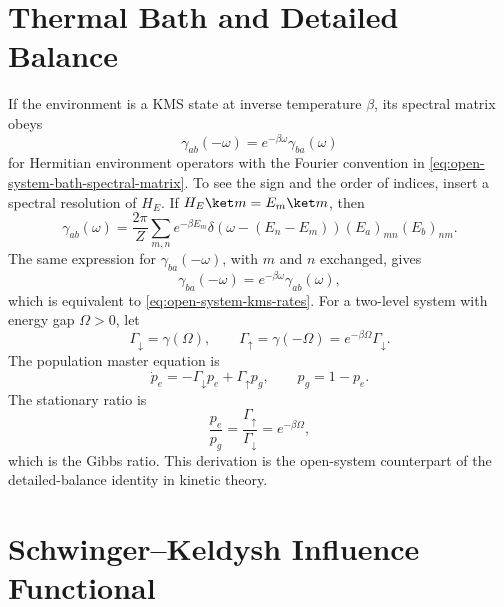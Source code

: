\section{Thermal Bath and Detailed Balance}

If the environment is a KMS state at inverse temperature \(\beta\), its
spectral matrix obeys
\begin{equation}
  \gamma_{ab}(-\omega)=e^{-\beta\omega}\gamma_{ba}(\omega)
  \label{eq:open-system-kms-rates}
\end{equation}
for Hermitian environment operators with the Fourier convention in
\eqref{eq:open-system-bath-spectral-matrix}.  To see the sign and the order
of indices, insert a spectral resolution of \(H_E\).  If
\(H_E\ket m=E_m\ket m\), then
\[
  \gamma_{ab}(\omega)
  =
  \frac{2\pi}{Z}
  \sum_{m,n}
  e^{-\beta E_m}
  \delta\!\left(\omega-(E_n-E_m)\right)
  (E_a)_{mn}(E_b)_{nm}.
\]
The same expression for \(\gamma_{ba}(-\omega)\), with \(m\) and \(n\)
exchanged, gives
\[
  \gamma_{ba}(-\omega)
  =
  e^{-\beta\omega}\gamma_{ab}(\omega),
\]
which is equivalent to \eqref{eq:open-system-kms-rates}.  For a two-level
system with energy gap \(\Omega>0\), let
\[
  \Gamma_\downarrow=\gamma(\Omega),
  \qquad
  \Gamma_\uparrow=\gamma(-\Omega)
  =
  e^{-\beta\Omega}\Gamma_\downarrow .
\]
The population master equation is
\[
  \dot p_e=-\Gamma_\downarrow p_e+\Gamma_\uparrow p_g,
  \qquad
  p_g=1-p_e .
\]
The stationary ratio is
\[
  \frac{p_e}{p_g}
  =
  \frac{\Gamma_\uparrow}{\Gamma_\downarrow}
  =
  e^{-\beta\Omega},
\]
which is the Gibbs ratio.  This derivation is the open-system counterpart of
the detailed-balance identity in kinetic theory.

\section{Schwinger--Keldysh Influence Functional}

